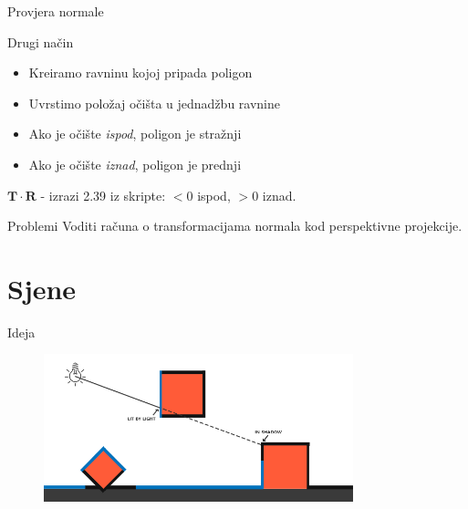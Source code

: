 \documentclass[9pt]{beamer}
\begin{document}
\begin{frame}{Provjera normale}
	\begin{block}{Drugi način}
		\begin{itemize}
			\item Kreiramo ravninu kojoj pripada poligon
			\item Uvrstimo položaj očišta u jednadžbu ravnine
			\item Ako je očište \textit{ispod}, poligon je stražnji
			\item Ako je očište \textit{iznad}, poligon je prednji
		\end{itemize}
		$\mathbf{T}\cdot \mathbf{R}$ - izrazi 2.39 iz skripte: $<0$ ispod, $>0$ iznad. 
	\end{block}
	
	\begin{block}{Problemi}
		Voditi računa o transformacijama normala kod perspektivne projekcije.
	\end{block}
\end{frame}

\section{Sjene}
\begin{frame}{Ideja}
	\begin{figure}
		\centering
		\includegraphics[width=0.8\textwidth]{slike/shadow_mapping_theory.png}
	\end{figure}
\end{frame}
\end{document}
